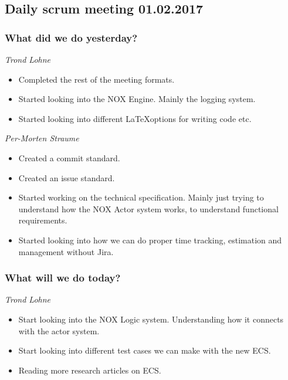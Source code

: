\documentclass{article}
\begin{document}
\begin{center}
\subsection*{Daily scrum meeting 01.02.2017}
\end{center}
\bigskip


\subsubsection*{What did we do yesterday?}

\noindent\textit{Trond Lohne}\\
\begin{itemize}
    \item
    Completed the rest of the meeting formats.

    \item
    Started looking into the NOX Engine. 
    Mainly the logging system.

    \item
    Started looking into different \LaTeX options for writing code etc.

\end{itemize}

\medskip

\noindent\textit{Per-Morten Straume}\\
\begin{itemize}
    \item
    Created a commit standard.

    \item
    Created an issue standard.

    \item
    Started working on the technical specification. 
    Mainly just trying to understand how the NOX Actor system works, 
    to understand functional requirements.

    \item
    Started looking into how we can do proper time tracking, 
    estimation and management without Jira.
\end{itemize}


\subsubsection*{What will we do today?}

\noindent\textit{Trond Lohne}\\
\begin{itemize}
    \item
    Start looking into the NOX Logic system. Understanding how it connects with the actor system.

    \item
    Start looking into different test cases we can make with the new ECS.

    \item
    Reading more research articles on ECS.
\end{itemize}
\end{document}
